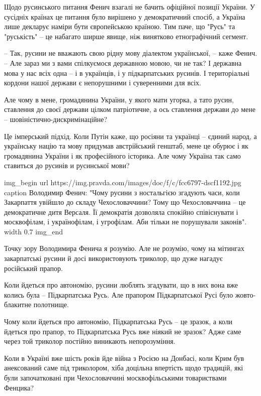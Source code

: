 Щодо русинського питання Фенич взагалі не бачить офіційної позиції України. У
сусідніх країнах це питання було вирішено у демократичний спосіб, а Україна
лише декларує наміри бути європейською країною. Тим паче, що "Русь" та
"руськість" – це набагато ширше явище, ніж винятково етнографічний сегмент.

– Так, русини не вважають свою рідну мову діалектом української, – каже Фенич.
– Але зараз ми з вами спілкуємося державною мовою, чи не так? І державна мова у
нас всіх одна – і в українців, і у підкарпатських русинів. І територіальні
кордони нашої держави є непорушними і суверенними для всіх.

Але чому в мене, громадянина України, у якого мати угорка, а тато русин,
ставлення до своєї держави цілком патріотичне, а ось ставлення держави до мене
– шовіністично-дискримінаційне?

Це імперський підхід. Коли Путін каже, що росіяни та українці – єдиний народ, а
українську націю та мову придумав австрійський генштаб, мене це обурює і як
громадянина України і як професійного історика. Але чому Україна так само
ставиться до русинів и русинської мови?

\ifcmt
img_begin 
        url https://img.pravda.com/images/doc/f/c/fcc6797-dscf1192.jpg
        caption Володимир Фенич: "Чому русини з ностальгією згадують часи, коли Закарпаття увійшло до складу Чехословаччини? Тому що Чехословаччина – це демократичне дитя Версаля. Її демократія дозволяла спокійно співіснувати і москвофілам, і українофілам, і угрофілам. Аби тільки не порушували законів".
        width 0.7
img_end
\fi

Точку зору Володимира Фенича я розумію. Але не розумію, чому на мітингах
закарпатські русини й досі використовують триколор, що дуже нагадує російський
прапор.

Коли йдеться про автономію, русини люблять згадувати, що в них вона вже колись
була – Підкарпатська Русь. Але прапором Підкарпатської Русі було жовто-блакитне
полотнище.

Чому коли йдеться про автономію, Підкарпатська Русь – це зразок, а коли йдеться
про прапор, то Підкарпатська Русь вже ніякий не зразок? Адже саме через той
триколор постійно виникають непорозуміння.  

Коли в Україні вже шість років йде війна з Росією на Донбасі, коли Крим був
анексований саме під триколором, хіба доцільна впертість щодо традицій, які
були започатковані при Чехословаччині москвофільськими товариствами Фенцика?

